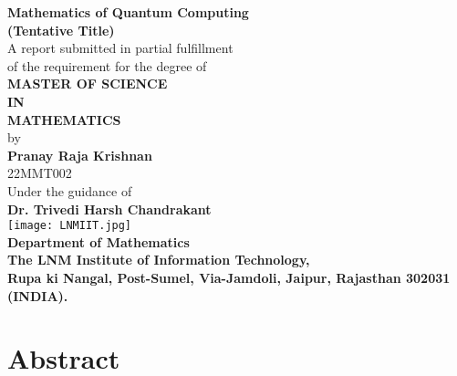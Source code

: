 \documentclass[12pt,twoside,fleqn]{report}
\theoremstyle{thmstyle}
\begin{document}
\begin{titlepage}
    \begin{center}
        \vspace*{0.15cm}
        \Huge{\textbf{\large Mathematics of Quantum Computing \\(Tentative Title)}}\\
        \vspace{0.25cm}
        \small
        A report submitted in partial fulfillment\\
        of the requirement for the  degree of  \\
        \vspace{0.15cm}
        \textbf{MASTER OF SCIENCE \\ IN \\ MATHEMATICS}\\
        \vspace{0.25cm}
        by\\ \vspace{0.25cm}
        \large
        \textbf{Pranay Raja Krishnan}\\
        \vspace{0.15cm}
        \large{22MMT002}\\
        \vspace{0.15cm}
        Under the guidance of\\
        \vspace{0.15cm}
        \textbf{Dr. Trivedi Harsh Chandrakant}\\

        \vspace{1cm}
        \texttt{[image: LNMIIT.jpg]}\\
        \vspace{1cm}
        \large
        \textbf{Department of Mathematics\\
        The LNM Institute of Information Technology,\\ Rupa ki Nangal, Post-Sumel, Via-Jamdoli, Jaipur, Rajasthan 302031 (INDIA).}\\%
    \end{center}
\end{titlepage}

\newpage

\chapter*{Abstract}
\lipsum[1]
\end{document}
